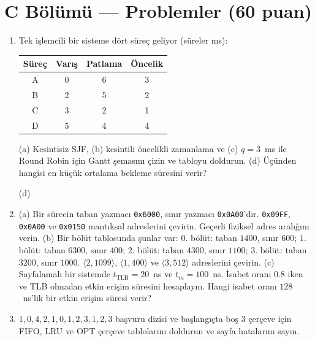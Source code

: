 \documentclass[11pt,a4paper]{article}
\begin{document}
\section*{C Bölümü --- Problemler \hfill (60 puan)}
\begin{enumerate}[leftmargin=2.0em,label=C\arabic*.,itemsep=0.5em]
  \item {} Tek işlemcili bir sisteme dört süreç geliyor (süreler ms):
  \begin{center}
  \begin{tabular}{@{}cccc@{}}
  \toprule
  \textbf{Süreç} & \textbf{Varış} & \textbf{Patlama} & \textbf{Öncelik} \\
  \midrule
  A & 0 & 6 & 3 \\ B & 2 & 5 & 2 \\ C & 3 & 2 & 1 \\ D & 5 & 4 & 4 \\
  \bottomrule
  \end{tabular}
  \end{center}
  (a) Kesintisiz SJF, (b) kesintili öncelikli zamanlama ve (c) $q = 3$~ms ile Round Robin için Gantt şemasını çizin ve tabloyu doldurun. (d) Üçünden hangisi en küçük ortalama bekleme süresini verir?

  \proctable
  \proctable
  \proctable
  \par\medskip (d) \hrulefill

  \newpage
  \item {}
  (a) Bir sürecin taban yazmacı \texttt{0x6000}, sınır yazmacı \texttt{0x0A00}'dır. \texttt{0x09FF}, \texttt{0x0A00} ve \texttt{0x0150} mantıksal adreslerini çevirin. Geçerli fiziksel adres aralığını verin. 
  \ans{2.6cm}
  (b) Bir bölüt tablosunda şunlar var: $0$. bölüt: taban $1400$, sınır $600$; $1$. bölüt: taban $6300$, sınır $400$; $2$. bölüt: taban $4300$, sınır $1100$; $3$. bölüt: taban $3200$, sınır $1000$. $\langle 2, 1099\rangle$, $\langle 1, 400\rangle$ ve $\langle 3, 512\rangle$ adreslerini çevirin. 
  \ans{2.4cm}
  (c) Sayfalamalı bir sistemde $t_{\text{TLB}} = 20$~ns ve $t_m = 100$~ns. İsabet oranı $0.8$ iken ve TLB olmadan etkin erişim süresini hesaplayın. Hangi isabet oranı $128$~ns'lik bir etkin erişim süresi verir? 
  \ans{2.6cm}

  \item {} $1, 0, 4, 2, 1, 0, 1, 2, 3, 1, 2, 3$ başvuru dizisi ve başlangıçta boş $3$ çerçeve için FIFO, LRU ve OPT çerçeve tablolarını doldurun ve sayfa hatalarını sayın.
  \par\medskip
  \par\medskip
  \par\medskip


\end{enumerate}
\end{document}
